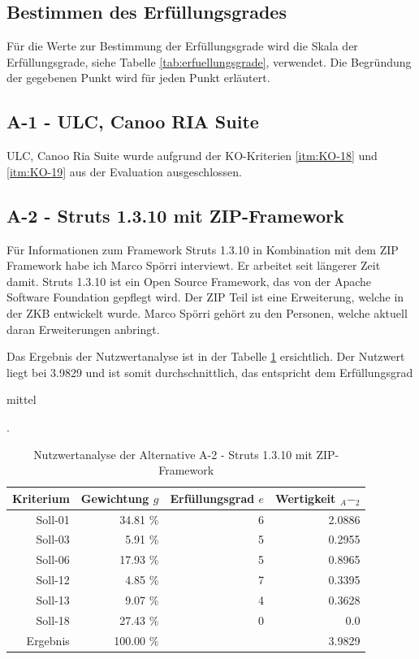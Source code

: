   \subsection{Bestimmen des Erfüllungsgrades}
  
  Für die Werte zur Bestimmung der Erfüllungsgrade wird die Skala der
  Erfüllungsgrade, siehe Tabelle \ref{tab:erfuellungsgrade}, verwendet. Die
  Begründung der gegebenen Punkt wird für jeden Punkt erläutert.
  
  \subsection{A-1 - ULC, Canoo RIA Suite}
  
  ULC, Canoo Ria Suite wurde aufgrund der KO-Kriterien \ref{itm:KO-18} und
  \ref{itm:KO-19} aus der Evaluation ausgeschlossen.
  
  \subsection{A-2 - Struts 1.3.10 mit ZIP-Framework}
  
  Für Informationen zum Framework Struts 1.3.10 in Kombination mit dem \ac{ZIP}
  Framework habe ich Marco Spörri interviewt. Er arbeitet seit längerer Zeit
  damit. Struts 1.3.10 ist ein Open Source Framework, das von der Apache
  Software Foundation gepflegt wird. Der \ac{ZIP} Teil ist eine Erweiterung,
  welche in der \ac{ZKB} entwickelt wurde. Marco Spörri gehört zu den Personen,
  welche aktuell daran Erweiterungen anbringt.

  Das Ergebnis der Nutzwertanalyse ist in der Tabelle
  \ref{tab:nwaA2} ersichtlich. Der Nutzwert liegt bei 3.9829 und ist somit
  durchschnittlich, das entspricht dem Erfüllungsgrad
  \begin{itshape}mittel\end{itshape}.
  
  \begin{table}[ht]
    \sffamily 
    \begin{center}
      \begin{tabular}{r|rrr}
        \toprule
        \textbf{Kriterium} & \textbf{Gewichtung \(g\)} & \textbf{Erfüllungsgrad
        \(e\)} & \textbf{Wertigkeit \(_A-_2\)} \\
        \midrule
        Soll-01   & 34.81 \% & 6 & 2.0886 \\
        Soll-03   &  5.91 \% & 5 & 0.2955 \\
        Soll-06   & 17.93 \% & 5 & 0.8965 \\
        Soll-12   &  4.85 \% & 7 & 0.3395 \\
        Soll-13   &  9.07 \% & 4 & 0.3628 \\
        Soll-18   & 27.43 \% & 0 & 0.0 \\
        \midrule
        \midrule
        Ergebnis  & 100.00 \% &   & 3.9829 \\
        \bottomrule
      \end{tabular}
      \caption{Nutzwertanalyse der Alternative A-2 - Struts 1.3.10 mit
      ZIP-Framework}
      \label{tab:nwaA2}
    \end{center}
  \end{table}
    
